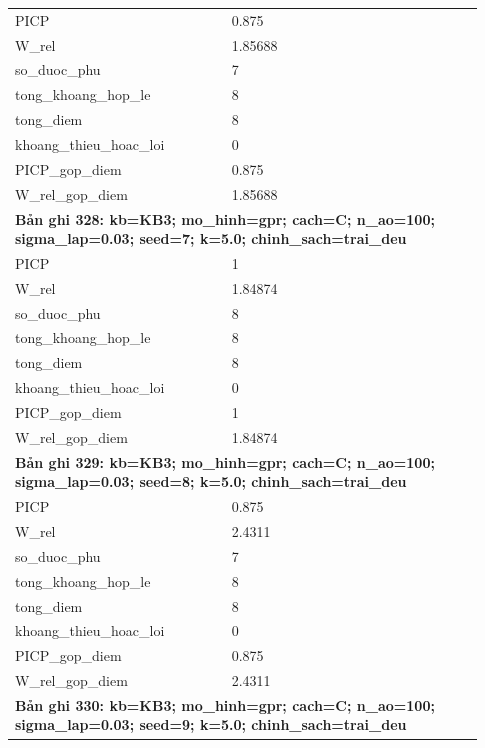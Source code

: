 \begin{longtable}{p{0.43\linewidth}p{0.50\linewidth}}
PICP & 0.875 \\
W\_\allowbreak rel & 1.85688 \\
so\_\allowbreak duoc\_\allowbreak phu & 7 \\
tong\_\allowbreak khoang\_\allowbreak hop\_\allowbreak le & 8 \\
tong\_\allowbreak diem & 8 \\
khoang\_\allowbreak thieu\_\allowbreak hoac\_\allowbreak loi & 0 \\
PICP\_\allowbreak gop\_\allowbreak diem & 0.875 \\
W\_\allowbreak rel\_\allowbreak gop\_\allowbreak diem & 1.85688 \\
\midrule
\multicolumn{2}{p{0.95\linewidth}}{\textbf{Bản ghi 328: kb=KB3; mo\_hinh=gpr; cach=C; n\_ao=100; sigma\_lap=0.03; seed=7; k=5.0; chinh\_sach=trai\_deu}} \\
PICP & 1 \\
W\_\allowbreak rel & 1.84874 \\
so\_\allowbreak duoc\_\allowbreak phu & 8 \\
tong\_\allowbreak khoang\_\allowbreak hop\_\allowbreak le & 8 \\
tong\_\allowbreak diem & 8 \\
khoang\_\allowbreak thieu\_\allowbreak hoac\_\allowbreak loi & 0 \\
PICP\_\allowbreak gop\_\allowbreak diem & 1 \\
W\_\allowbreak rel\_\allowbreak gop\_\allowbreak diem & 1.84874 \\
\midrule
\multicolumn{2}{p{0.95\linewidth}}{\textbf{Bản ghi 329: kb=KB3; mo\_hinh=gpr; cach=C; n\_ao=100; sigma\_lap=0.03; seed=8; k=5.0; chinh\_sach=trai\_deu}} \\
PICP & 0.875 \\
W\_\allowbreak rel & 2.4311 \\
so\_\allowbreak duoc\_\allowbreak phu & 7 \\
tong\_\allowbreak khoang\_\allowbreak hop\_\allowbreak le & 8 \\
tong\_\allowbreak diem & 8 \\
khoang\_\allowbreak thieu\_\allowbreak hoac\_\allowbreak loi & 0 \\
PICP\_\allowbreak gop\_\allowbreak diem & 0.875 \\
W\_\allowbreak rel\_\allowbreak gop\_\allowbreak diem & 2.4311 \\
\midrule
\multicolumn{2}{p{0.95\linewidth}}{\textbf{Bản ghi 330: kb=KB3; mo\_hinh=gpr; cach=C; n\_ao=100; sigma\_lap=0.03; seed=9; k=5.0; chinh\_sach=trai\_deu}} \\

\end{longtable}
